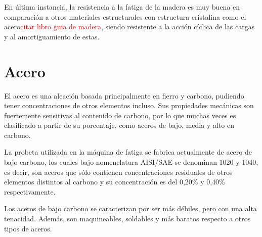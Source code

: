 En última instancia, la resistencia a la fatiga de la madera es muy buena en comparación a otros materiales estructurales con estructura cristalina como el acero\textcolor{red}{citar libro guia de madera}, siendo resistente a la acción cíclica de las cargas y al amortiguamiento de estas. 

\section{Acero}
El acero es una aleación basada principalmente en fierro y carbono, pudiendo tener concentraciones de otros elementos incluso. Sus propiedades mecánicas son fuertemente sensitivas al contenido de carbono, por lo que muchas veces es clasificado a partir de su porcentaje, como aceros de bajo, media y alto en carbono.

La probeta utilizada en la máquina de fatiga se fabrica actualmente de acero de bajo carbono, los cuales bajo nomenclatura AISI/SAE se denominan 1020 y 1040, es decir, son aceros que sólo contienen concentraciones residuales de otros elementos distintos al carbono y su concentración es del 0,20\% y 0,40\% respectivamente.

Los aceros de bajo carbono se caracterizan por ser más débiles, pero con una alta tenacidad. Además, son maquineables, soldables y más baratos respecto a otros tipos de aceros. 




